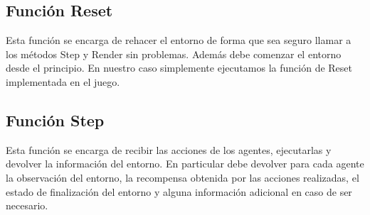 \subsection*{Función Reset}

Esta función se encarga de rehacer el entorno de forma que sea seguro llamar a los métodos Step y Render sin problemas. Además debe comenzar el entorno desde el principio. En nuestro caso simplemente ejecutamos la función de Reset implementada en el juego.

\subsection*{Función Step}

Esta función se encarga de recibir las acciones de los agentes, ejecutarlas y devolver la información del entorno. En particular debe devolver para cada agente la observación del entorno, la recompensa obtenida por las acciones realizadas, el estado de finalización del entorno y alguna información adicional en caso de ser necesario.
